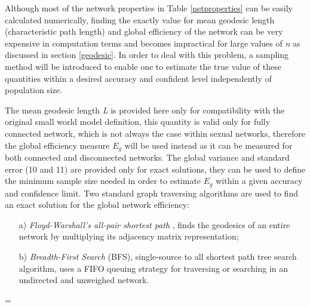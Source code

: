Although most of the network properties in Table \ref{netproperties} can be easily
calculated numerically, finding the exactly value for mean geodesic length (characteristic path
length) and global efficiency of the network can be very expensive in computation terms
and becomes impractical for large values of \emph{n} as discussed in section
\ref{geodesic}. In order to deal with this problem, a sampling method will be introduced
to enable one to estimate the true value of these quantities within a desired
accuracy and confident level independently of population size.

The mean geodesic length \emph{L} is provided here only for compatibility with the
original small world model \cite{Watts1998} definition, this quantity is valid only for
fully connected network, which is not always the case within sexual networks, therefore
the global efficiency measure $E_g$ will be used instead as it can be measured for both connected
and disconnected networks. The global variance and standard error (10 and 11) are
provided only for exact solutions, they can be used to define the minimum sample size
needed in order to estimate $E_g$ within a given accuracy and confidence limit. Two
standard graph traversing algorithms are used to find an exact solution for the global
network efficiency:
\parskip=0pt
\begin{enumerate}
    \item [a)] \emph{Floyd-Warshall's all-pair shortest path} \cite{Floyd1962,Warshall1962},
    finds the geodesics of an entire network by multiplying its adjacency matrix
    representation;
    \item [b)] \emph{Breadth-First Search} (BFS), single-source to all
    shortest path tree search algorithm, uses a FIFO queuing strategy for
    traversing or searching in an undirected and unweighed network.
\end{enumerate}
\parskip=\baselineskip

